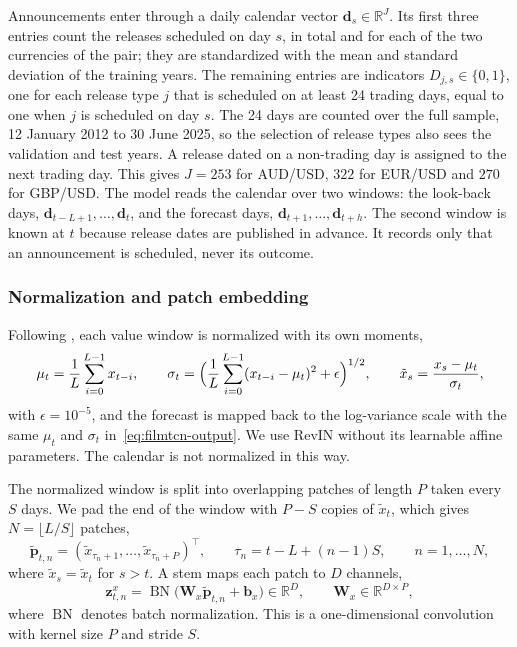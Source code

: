 Announcements enter through a daily calendar vector
$\mathbf{d}_s \in \mathbb{R}^{J}$. Its first three entries count the releases
scheduled on day $s$, in total and for each of the two currencies of the pair;
they are standardized with the mean and standard deviation of the training
years. The remaining entries are indicators $D_{j,s}\in\{0,1\}$, one for each
release type $j$ that is scheduled on at least 24 trading days, equal to one
when $j$ is scheduled on day $s$. The 24 days are counted over the full sample,
12 January 2012 to 30 June 2025, so the selection of release types also sees
the validation and test years. A release dated on a non-trading day is
assigned to the next trading day. This gives $J = 253$ for AUD/USD, $322$ for
EUR/USD and $270$ for GBP/USD. The model reads the calendar over two windows:
the look-back days, $\mathbf{d}_{t-L+1},\dots,\mathbf{d}_t$, and the forecast
days, $\mathbf{d}_{t+1},\dots,\mathbf{d}_{t+h}$. The second window is known at
$t$ because release dates are published in advance. It records only that an
announcement is scheduled, never its outcome.

\subsubsection{Normalization and patch embedding}
\label{sec:filmtcn-embedding}

Following \citet{kim2022revin}, each value window is normalized with its own
moments,
\begin{equation}
  \mu_t = \frac{1}{L}\sum_{i=0}^{L-1} x_{t-i}, \qquad
  \sigma_t = \Bigl(\frac{1}{L}\sum_{i=0}^{L-1}(x_{t-i}-\mu_t)^2
             + \epsilon\Bigr)^{1/2}, \qquad
  \tilde{x}_s = \frac{x_s-\mu_t}{\sigma_t},
  \label{eq:filmtcn-revin}
\end{equation}
with $\epsilon = 10^{-5}$, and the forecast is mapped back to the log-variance
scale with the same $\mu_t$ and $\sigma_t$ in~\eqref{eq:filmtcn-output}. We use
RevIN without its learnable affine parameters. The calendar is not normalized
in this way.

The normalized window is split into overlapping patches of length $P$ taken
every $S$ days. We pad the end of the window with $P-S$ copies of
$\tilde{x}_t$, which gives $N = \lfloor L/S \rfloor$ patches,
\begin{equation}
  \tilde{\mathbf{p}}_{t,n}
  = (\tilde{x}_{\tau_n+1},\dots,\tilde{x}_{\tau_n+P})^\top,
  \qquad \tau_n = t-L+(n-1)S, \qquad n = 1,\dots,N,
  \label{eq:filmtcn-patch}
\end{equation}
where $\tilde{x}_s = \tilde{x}_t$ for $s>t$. A stem maps each patch to $D$
channels,
\begin{equation}
  \mathbf{z}^{x}_{t,n}
  = \operatorname{BN}\bigl(\mathbf{W}_x\tilde{\mathbf{p}}_{t,n}
    + \mathbf{b}_x\bigr) \in \mathbb{R}^{D},
  \qquad \mathbf{W}_x \in \mathbb{R}^{D\times P},
  \label{eq:filmtcn-stem-x}
\end{equation}
where $\operatorname{BN}$ denotes batch normalization. This is a
one-dimensional convolution with kernel size $P$ and stride $S$.

